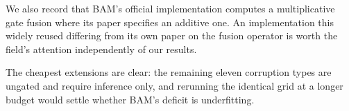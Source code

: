 \documentclass[10pt]{article}
\begin{document}
We also record that BAM's official implementation computes a multiplicative gate
fusion where its paper specifies an additive one. An implementation this widely
reused differing from its own paper on the fusion operator is worth the
field's attention independently of our results.

The cheapest extensions are clear: the remaining eleven corruption types are
ungated and require inference only, and rerunning the identical grid at a longer
budget would settle whether BAM's deficit is underfitting.



\end{document}
